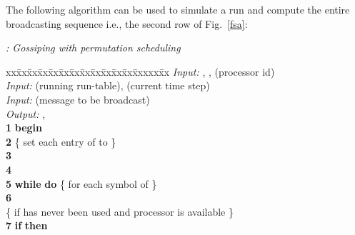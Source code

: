 \documentclass{elsart}
\newcommand{\keyw}[1]{\hbox{\bf #1}}
\begin{document}
The following algorithm can be used to simulate a run and compute
the entire broadcasting sequence i.e.,
the second row of Fig.~\ref{fsa}:

\begin{alg}{\emph{: Gossiping with permutation scheduling}}
\begin{tabbing}
xx\=xx\=xx\=xx\=xx\=xx\=xx\=xx\=xx\=xx\=xx\=xx\=xxxxx\=xx\kill
         \> \> \emph{Input:\/} , ,  (processor id)\\
         \> \> \emph{Input:\/}  (running run-table),  (current time step)\\
         \> \> \emph{Input:\/}  (message to be broadcast)\\
         \> \> \emph{Output:\/} , \\
{\bf 1} \> \> \keyw{begin}\\
{\bf 2} \> \> \>  \>\>\>\>\>\>\>\>\>\> \{ set each entry of  to  \} \\
{\bf 3} \> \> \>  \\
{\bf 4} \> \> \>  \\
{\bf 5} \> \> \> \keyw{while}  \keyw{do} \>\>\>\>\>\>\>\>\>\> \{ for each symbol of  \} \\
{\bf 6} \> \> \> \>  \\

         \> \> \> \> \{ if  has never been used and processor  is available \} \\
{\bf 7} \> \> \> \> \keyw{if}  
                     \keyw{then} \\


\end{tabbing}
\end{alg}
\end{document}
